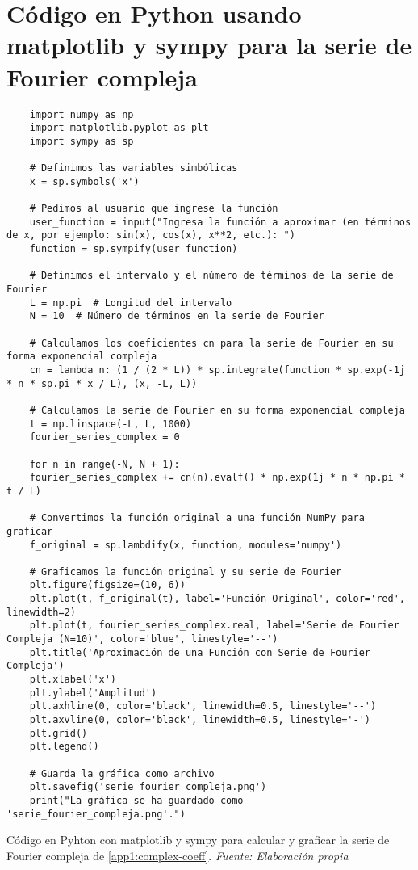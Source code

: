 \section{Código en Python usando matplotlib y sympy para la serie de Fourier compleja}\label{app2:complex-code-python-matplotlib-sympy}
\begin{longlisting}
	\begin{verbatim}
	import numpy as np
	import matplotlib.pyplot as plt
	import sympy as sp
	
	# Definimos las variables simbólicas
	x = sp.symbols('x')
	
	# Pedimos al usuario que ingrese la función
	user_function = input("Ingresa la función a aproximar (en términos de x, por ejemplo: sin(x), cos(x), x**2, etc.): ")
	function = sp.sympify(user_function)
	
	# Definimos el intervalo y el número de términos de la serie de Fourier
	L = np.pi  # Longitud del intervalo
	N = 10  # Número de términos en la serie de Fourier
	
	# Calculamos los coeficientes cn para la serie de Fourier en su forma exponencial compleja
	cn = lambda n: (1 / (2 * L)) * sp.integrate(function * sp.exp(-1j * n * sp.pi * x / L), (x, -L, L))
	
	# Calculamos la serie de Fourier en su forma exponencial compleja
	t = np.linspace(-L, L, 1000)
	fourier_series_complex = 0
	
	for n in range(-N, N + 1):
	fourier_series_complex += cn(n).evalf() * np.exp(1j * n * np.pi * t / L)
	
	# Convertimos la función original a una función NumPy para graficar
	f_original = sp.lambdify(x, function, modules='numpy')
	
	# Graficamos la función original y su serie de Fourier
	plt.figure(figsize=(10, 6))
	plt.plot(t, f_original(t), label='Función Original', color='red', linewidth=2)
	plt.plot(t, fourier_series_complex.real, label='Serie de Fourier Compleja (N=10)', color='blue', linestyle='--')
	plt.title('Aproximación de una Función con Serie de Fourier Compleja')
	plt.xlabel('x')
	plt.ylabel('Amplitud')
	plt.axhline(0, color='black', linewidth=0.5, linestyle='--')
	plt.axvline(0, color='black', linewidth=0.5, linestyle='-')
	plt.grid()
	plt.legend()
	
	# Guarda la gráfica como archivo
	plt.savefig('serie_fourier_compleja.png')
	print("La gráfica se ha guardado como 'serie_fourier_compleja.png'.")
	\end{verbatim}
	\caption[Código en Pyhton con matplotlib y sympy para calcular y graficar la serie de Fourier compleja de \ref{app1:complex-coeff}.] {Código en Pyhton con matplotlib y sympy para calcular y graficar la serie de Fourier compleja de \ref{app1:complex-coeff}. \textit{Fuente: Elaboración propia}} 
\end{longlisting}


